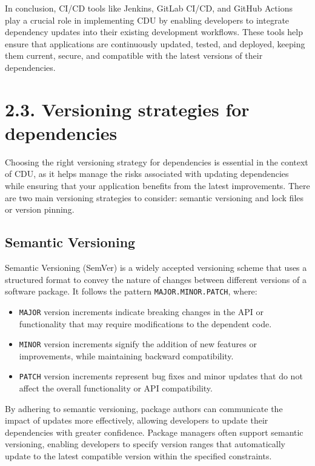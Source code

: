 \documentclass[10pt]{article}
\begin{document}
In conclusion, CI/CD tools like Jenkins, GitLab CI/CD, and GitHub Actions play a crucial role in implementing CDU by enabling developers to integrate dependency updates into their existing development workflows. These tools help ensure that applications are continuously updated, tested, and deployed, keeping them current, secure, and compatible with the latest versions of their dependencies.

\section*{2.3. Versioning strategies for dependencies}

Choosing the right versioning strategy for dependencies is essential in the context of CDU, as it helps manage the risks associated with updating dependencies while ensuring that your application benefits from the latest improvements. There are two main versioning strategies to consider: semantic versioning and lock files or version pinning.

\subsection*{Semantic Versioning}

Semantic Versioning (SemVer) is a widely accepted versioning scheme that uses a structured format to convey the nature of changes between different versions of a software package. It follows the pattern \texttt{MAJOR.MINOR.PATCH}, where:

\begin{itemize}

  \item \texttt{MAJOR} version increments indicate breaking changes in the API or functionality that may require modifications to the dependent code.

  \item \texttt{MINOR} version increments signify the addition of new features or improvements, while maintaining backward compatibility.

  \item \texttt{PATCH} version increments represent bug fixes and minor updates that do not affect the overall functionality or API compatibility.

\end{itemize}

By adhering to semantic versioning, package authors can communicate the impact of updates more effectively, allowing developers to update their dependencies with greater confidence. Package managers often support semantic versioning, enabling developers to specify version ranges that automatically update to the latest compatible version within the specified constraints.
\end{document}
